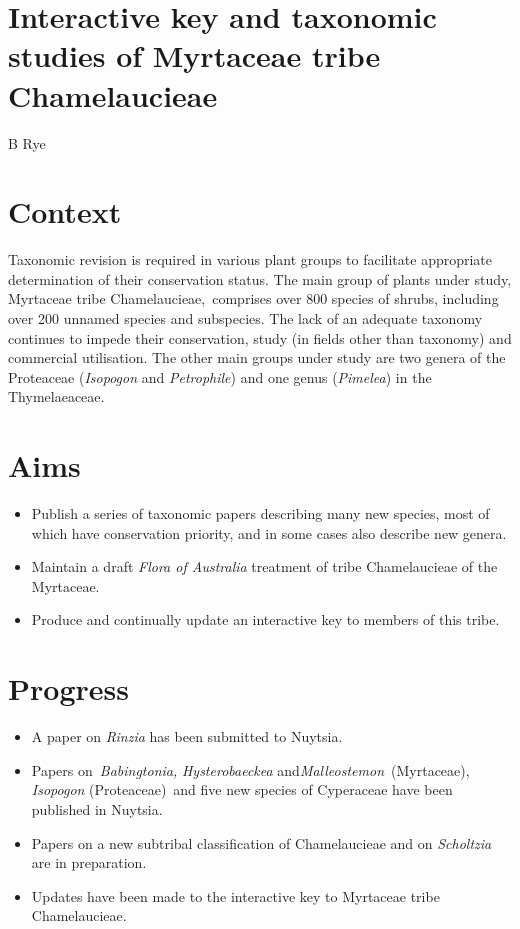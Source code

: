 \documentclass[version=last,
    paper=a4, %
    10pt, %
    usenames,
    dvipsnames,
    oneside, %
    headings=openany, %
    DIV=15 %
]{scrbook}
\begin{document}
\section*{Interactive key and taxonomic studies of Myrtaceae tribe Chamelaucieae
}

B Rye


\section*{Context}
Taxonomic revision is required in various plant groups to facilitate
appropriate determination of their conservation status. The main group
of plants under study, Myrtaceae tribe Chamelaucieae,~comprises over 800
species of shrubs, including over 200 unnamed species and subspecies.
The lack of an adequate taxonomy continues to impede their conservation,
study (in fields other than taxonomy) and commercial utilisation. The
other main groups under study are two genera of the Proteaceae
(\emph{Isopogon} and \emph{Petrophile}) and one genus (\emph{Pimelea})
in the Thymelaeaceae.



\section*{Aims}
\begin{itemize}
\itemsep1pt\parskip0pt
\item
  Publish a series of taxonomic papers describing many new species, most
  of which have conservation priority, and in some cases also describe
  new genera.
\item
  Maintain a draft \emph{Flora of Australia} treatment of tribe
  Chamelaucieae of the Myrtaceae.
\item
  Produce and continually update an interactive key to members of this
  tribe.
\end{itemize}



\section*{Progress}
\begin{itemize}
\itemsep1pt\parskip0pt
\item
  A paper on \emph{Rinzia} has been submitted to Nuytsia.
\item
  Papers on~\emph{Babingtonia,} \emph{Hysterobaeckea}
  and\emph{Malleostemon}~(Myrtaceae), \emph{Isopogon} (Proteaceae)~and
  five new species of Cyperaceae have been published in Nuytsia.
\item
  Papers on a new subtribal classification of Chamelaucieae and on
  \emph{Scholtzia} are in preparation.
\item
  Updates have been made to the interactive key to Myrtaceae tribe
  Chamelaucieae.
\end{itemize}
\end{document}
